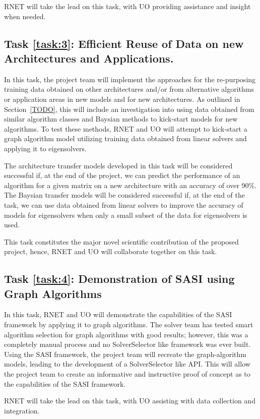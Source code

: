 RNET will take the lead on this task, with UO providing assistance and insight when needed. 


\label{task:3}
\subsection{Task \ref{task:3}: Efficient Reuse of Data on new Architectures and Applications.}
In this task, the project team will implement the approaches for the re-purposing training data obtained on other architectures and/or from alternative algorithms or application areas in new models and for new architectures. As outlined in Section~\ref{TODO}, this will include an investigation into using data obtained from similar algorithm classes and Baysian methods to kick-start models for new algorithms. To test these methods, RNET and UO will attempt to kick-start a graph algorithm model utilizing training data obtained from linear solvers and applying it to eigensolvers. 

The architecture transfer models developed in this task will be considered successful if, at the end of the project, we can predict the performance of an algorithm for a given matrix on a new architecture with an accuracy of over 90\%. The Baysian transfer models will be considered successful if, at the end of the task, we can use data obtained from linear solvers to improve the accuracy of models for eigensolvers when only a small subset of the data for eigensolvers is used.  

This task constitutes the major novel scientific contribution of the proposed project, hence, RNET and UO will collaborate together on this task. 

\label{task:4}
\subsection{Task \ref{task:4}: Demonstration of SASI using Graph Algorithms }

In this task, RNET and UO will demonstrate the capabilities of the SASI framework by applying 
it to graph algorithms. The solver team has tested smart algorithm selection for graph algorithms 
with good results; however, this was a completely manual process and no SolverSelector like framework was ever built. Using 
the SASI framework, the project team will recreate the graph-algorithm models, leading to the development of a SolverSelector
like API. This will allow the project team to create an informative and instructive proof of concept as to the capabilities 
of the SASI framework. 

RNET will take the lead on this task, with UO assisting with data collection and integration. 
